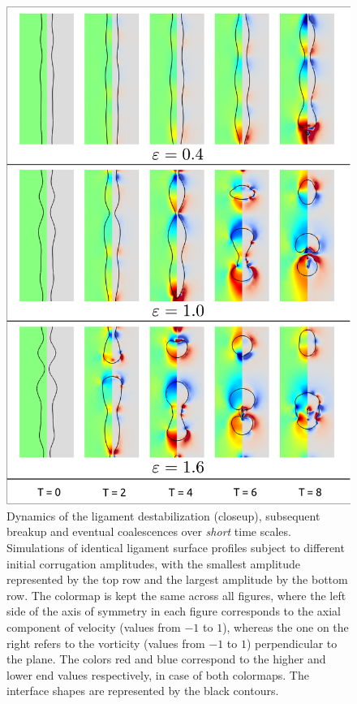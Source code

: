 \begin{figure}
\centering
\includegraphics{plots/ligament_breakup/amplitude_compare.pdf}
	\caption{Dynamics of the ligament destabilization (closeup), subsequent breakup 
	and eventual coalescences over \textit{short} time scales.
	Simulations of identical ligament surface profiles
	subject to different initial corrugation amplitudes, with the smallest 
	amplitude represented by the top row and the largest amplitude by the bottom row. 
	The colormap is kept the same across all figures, where the left 
	side of the axis of symmetry in each figure corresponds to the axial component of 
	velocity (values from $-1$ to $1$), whereas the one on the right refers to 
	the vorticity (values from $-1$ to $1$) perpendicular to the plane. 
	The colors red and blue correspond to the higher and lower 
	end values respectively, in case of both colormaps. 
	The interface shapes are represented by the black contours.
	}
\label{amp_comp}
\end{figure}

